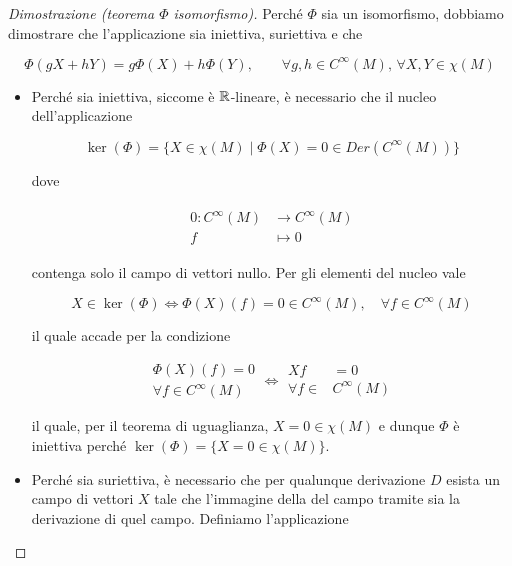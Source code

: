 \begin{proof}[Dimostrazione (teorema $ \Phi $ isomorfismo)]
	Perché $ \Phi $ sia un isomorfismo, dobbiamo dimostrare che l'applicazione sia iniettiva, suriettiva e che
	
	\begin{equation}
		\Phi(g X + h Y) = g \Phi(X) + h \Phi(Y), \qquad \forall g,h \in C^{\infty}(M), \, \forall X,Y \in \chi(M)
	\end{equation}

\begin{itemize}
	\item Perché sia iniettiva, siccome è $ \mathbb{R} $-lineare, è necessario che il nucleo dell'applicazione
	
	\begin{equation}
		\ker(\Phi) = \{ X \in \chi(M) \mid \Phi(X) = 0 \in Der(C^{\infty}(M)) \}
	\end{equation}

	dove
	
	\begin{align}
		\begin{split}
			0 : C^{\infty}(M) &\to C^{\infty}(M)\\
			f &\mapsto 0
		\end{split}
	\end{align}

	contenga solo il campo di vettori nullo. Per gli elementi del nucleo vale
	
	\begin{equation}
		X \in \ker(\Phi) \iff \Phi(X)(f) = 0 \in C^{\infty}(M), \quad \forall f \in C^{\infty}(M)
	\end{equation}

	il quale accade per la condizione
	
	\begin{equation}
		\begin{aligned}
			\Phi(X)(f) = 0\\
			\forall f \in C^{\infty}(M)
		\end{aligned}%
		\iff %
		\begin{aligned}
			X f &= 0\\
			\forall f \in &C^{\infty}(M)
		\end{aligned}
	\end{equation}

	il quale, per il teorema di uguaglianza, $ X = 0 \in \chi(M) $ e dunque $ \Phi $ è iniettiva perché $ \ker(\Phi) = \{ X = 0 \in \chi(M) \} $.
	
	\item Perché sia suriettiva, è necessario che per qualunque derivazione $ D $ esista un campo di vettori $ X $ tale che l'immagine della del campo tramite  sia la derivazione di quel campo. Definiamo l'applicazione
	

\end{itemize}
\end{proof}
